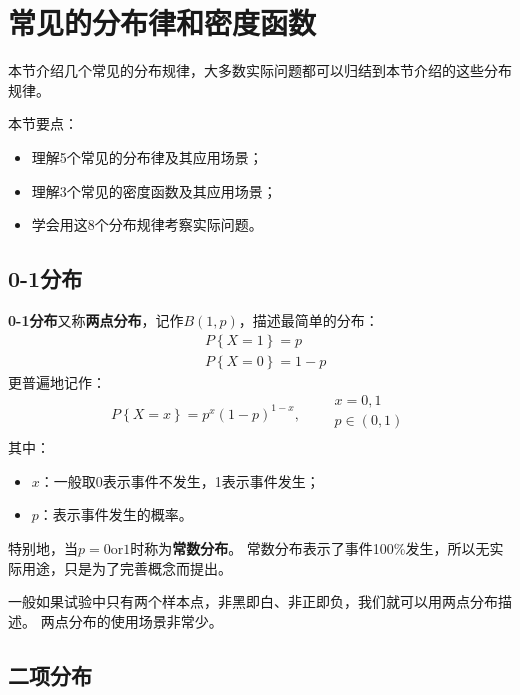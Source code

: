 \section{常见的分布律和密度函数}

本节介绍几个常见的分布规律，大多数实际问题都可以归结到本节介绍的这些分布规律。

本节要点：
\begin{itemize}
    \item 理解5个常见的分布律及其应用场景；
    \item 理解3个常见的密度函数及其应用场景；
    \item 学会用这8个分布规律考察实际问题。
\end{itemize}

\subsection{0-1分布}

{\bf 0-1分布}又称{\bf 两点分布}，记作$B\left( 1,p \right) $，描述最简单的分布：
\begin{align*}
&P\left\{ X=1 \right\} =p\\
&P\left\{ X=0 \right\} =1-p
\end{align*}
更普遍地记作：
\[
P\left\{ X=x \right\} =p^x\left( 1-p \right) ^{1-x},\qquad \begin{array}{l}
	x=0,1\\
	p\in \left( 0,1 \right)\\
\end{array}
\]
其中：
\begin{itemize}
    \item $x$：一般取0表示事件不发生，1表示事件发生；
    \item $p$：表示事件发生的概率。
\end{itemize}
特别地，当$p=0\mathrm{or}1$时称为{\bf 常数分布}。
常数分布表示了事件100\%发生，所以无实际用途，只是为了完善概念而提出。

\begin{tcolorbox}
一般如果试验中只有两个样本点，非黑即白、非正即负，我们就可以用两点分布描述。
两点分布的使用场景非常少。
\end{tcolorbox}

\subsection{二项分布}

